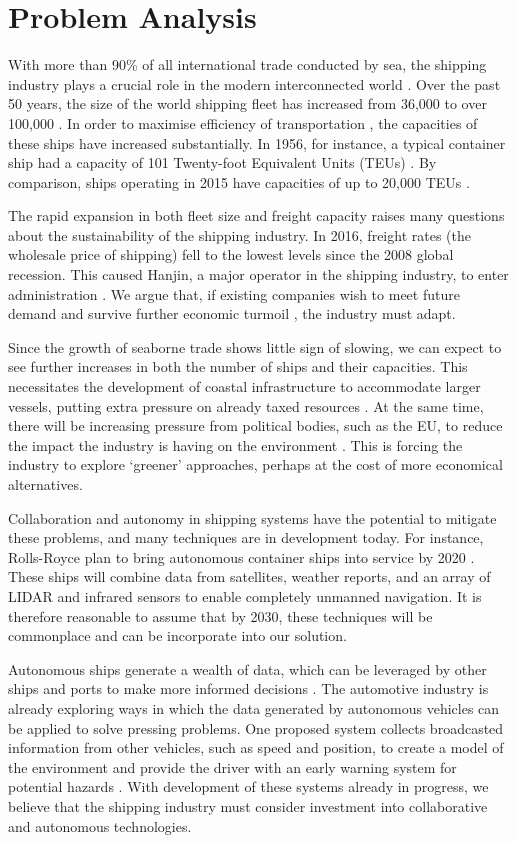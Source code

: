 \section{Problem Analysis}
With more than 90\% of all international trade conducted by sea, the shipping industry plays a crucial role in the modern interconnected world \cite{IMOfacts}. Over the past 50 years, the size of the world shipping fleet has increased from 36,000 to over 100,000 \cite{IMOfacts}. In order to maximise efficiency of transportation \cite{sizematters}, the capacities of these ships have increased substantially. In 1956, for instance, a typical container ship had a capacity of 101 Twenty-foot Equivalent Units (TEUs) \cite{ftarticle}. By comparison, ships operating in 2015 have capacities of up to 20,000 TEUs \cite{sizematters}.

The rapid expansion in both fleet size and freight capacity raises many questions about the sustainability of the shipping industry. In 2016, freight rates (the wholesale price of shipping) fell to the lowest levels since the 2008 global recession. This caused Hanjin, a major operator in the shipping industry, to enter administration \cite{globalCrisis}. We argue that, if existing companies wish to meet future demand and survive further economic turmoil \cite{5trends}, the industry must adapt. 

Since the growth of seaborne trade shows little sign of slowing, we can expect to see further increases in both the number of ships and their capacities. This necessitates the development of coastal infrastructure to accommodate larger vessels, putting extra pressure on already taxed resources \cite{ftarticle}. At the same time, there will be increasing pressure from political bodies, such as the EU, to reduce the impact the industry is having on the environment \cite{eureport}. This is forcing the industry to explore `greener’ approaches, perhaps at the cost of more economical alternatives.

Collaboration and autonomy in shipping systems have the potential to mitigate these problems, and many techniques are in development today. For instance, Rolls-Royce plan to bring autonomous container ships into service by 2020 \cite{autoboats}. These ships will combine data from satellites, weather reports, and an array of LIDAR and infrared sensors to enable completely unmanned navigation. It is therefore reasonable to assume that by 2030, these techniques will be commonplace and can be incorporate into our solution.  

Autonomous ships generate a wealth of data, which can be leveraged by other ships and ports to make more informed decisions \cite{5trends}. The automotive industry is already exploring ways in which the data generated by autonomous vehicles can be applied to solve pressing problems. One proposed system collects broadcasted information from other vehicles, such as speed and position, to create a model of the environment and provide the driver with an early warning system for potential hazards \cite{c2c}. With development of these systems already in progress, we believe that the shipping industry must consider investment into collaborative and autonomous technologies.
